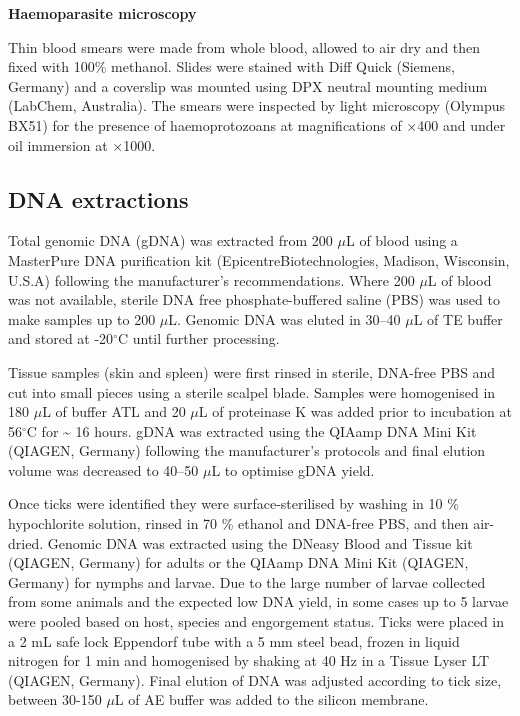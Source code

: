 \documentclass[a4paper, nobind]{templates/ociamthesis}
\begin{document}
\textbf{Haemoparasite microscopy}

Thin blood smears were made from whole blood, allowed to air dry and then fixed with 100\% methanol.
Slides were stained with Diff Quick (Siemens, Germany) and a coverslip was mounted using DPX neutral mounting medium (LabChem, Australia).
The smears were inspected by light microscopy (Olympus BX51) for the presence of haemoprotozoans at magnifications of ×400 and under oil immersion at ×1000.

\hypertarget{dna-extractions-1}{%
\subsection{DNA extractions}\label{dna-extractions-1}}

Total genomic DNA (gDNA) was extracted from 200 \(\mu\)L of blood using a MasterPure DNA purification kit (Epicentre\textregistered Biotechnologies, Madison, Wisconsin, U.S.A) following the manufacturer's recommendations.
Where 200 \(\mu\)L of blood was not available, sterile DNA free phosphate-buffered saline (PBS) was used to make samples up to 200 \(\mu\)L. Genomic DNA was eluted in 30--40 \(\mu\)L of TE buffer and stored at -20\(^\circ\)C until further processing.

Tissue samples (skin and spleen) were first rinsed in sterile, DNA-free PBS and cut into small pieces using a sterile scalpel blade. Samples were homogenised in 180 \(\mu\)L of buffer ATL and 20 \(\mu\)L of proteinase K was added prior to incubation at 56\(^\circ\)C for \textasciitilde{} 16 hours. gDNA was extracted using the QIAamp DNA Mini Kit (QIAGEN, Germany) following the manufacturer's protocols and final elution volume was decreased to 40--50 \(\mu\)L to optimise gDNA yield.

Once ticks were identified they were surface-sterilised by washing in 10 \% hypochlorite solution, rinsed in 70 \% ethanol and DNA-free PBS, and then air-dried.
Genomic DNA was extracted using the DNeasy Blood and Tissue kit (QIAGEN, Germany) for adults or the QIAamp DNA Mini Kit (QIAGEN, Germany) for nymphs and larvae.
Due to the large number of larvae collected from some animals and the expected low DNA yield, in some cases up to 5 larvae were pooled based on host, species and engorgement status.
Ticks were placed in a 2 mL safe lock Eppendorf tube with a 5 mm steel bead, frozen in liquid nitrogen for 1 min and homogenised by shaking at 40 Hz in a Tissue Lyser LT (QIAGEN, Germany).
Final elution of DNA was adjusted according to tick size, between 30-150 \(\mu\)L of AE buffer was added to the silicon membrane.
\end{document}
